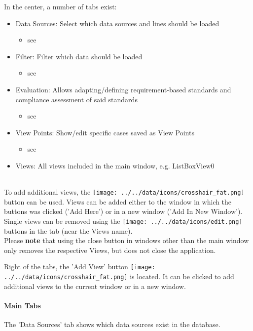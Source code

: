 In the center, a number of tabs exist:
\begin{itemize}
 \item Data Sources: Select which data sources and lines should be loaded
  \begin{itemize}
 \item see 
 \end{itemize}
 \item Filter: Filter which data should be loaded
   \begin{itemize}
 \item see 
 \end{itemize}
 \item Evaluation: Allows adapting/defining requirement-based standards and compliance assessment of said standards
 \begin{itemize}
 \item see 
 \end{itemize}
 \item View Points: Show/edit specific cases saved as View Points
  \begin{itemize}
 \item see 
 \end{itemize}
 \item Views: All views included in the main window, e.g. ListBoxView0
\end{itemize}
\  \\

To add additional views, the \texttt{[image: ../../data/icons/crosshair\_fat.png]} button can be used. Views can be added either to the window in which the buttons was clicked ('Add Here') or in a new window ('Add In New Window'). \\

Single views can be removed using the \texttt{[image: ../../data/icons/edit.png]} buttons in the tab (near the Views name). \\

Please \textbf{note} that using the close button in windows other than the main window only removes the respective Views, but does not close the application.

Right of the tabs, the 'Add View' button \texttt{[image: ../../data/icons/crosshair\_fat.png]} is located. It can be clicked to add additional views to the current window or in a new window. \\

\paragraph{Main Tabs}
The 'Data Sources' tab shows which data sources exist in the database. \\

